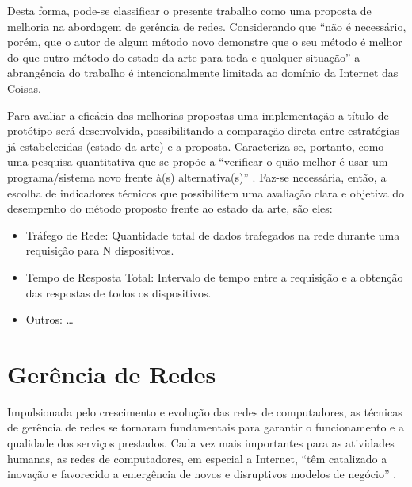 \documentclass[twoside,english,brazilian]{UNISINOSmonografia}
\begin{document}
Desta forma, pode-se classificar o presente trabalho como uma proposta de 
melhoria na abordagem de gerência de redes. Considerando que ``não é 
necessário, porém, que o autor de algum método novo demonstre que o seu método 
é melhor do que outro método do estado da arte para toda e qualquer situação'' 
\cite{Wazlawick2008} a abrangência do trabalho é intencionalmente limitada ao 
domínio da Internet das Coisas. %

Para avaliar a eficácia das melhorias propostas uma implementação a título de  
protótipo será desenvolvida, possibilitando a comparação direta entre 
estratégias já estabelecidas (estado da arte) e a proposta. Caracteriza-se, 
portanto, como uma pesquisa quantitativa que se propõe a ``verificar o
quão melhor é usar um programa/sistema novo frente à(s) alternativa(s)'' 
\cite{Jacques2007}.
Faz-se necessária, então, a escolha de indicadores técnicos que
possibilitem uma avaliação clara e objetiva do desempenho do 
método proposto frente ao estado da arte, são eles:


\begin{itemize}

	\item Tráfego de Rede: 
Quantidade total de dados trafegados na rede durante uma requisição para N dispositivos.

	\item Tempo de Resposta Total: 
Intervalo de tempo entre a requisição e a obtenção das respostas de todos os dispositivos.

	\item Outros: \dots
\end{itemize}


\chapter{Gerência de Redes}

	Impulsionada pelo crescimento e evolução das redes de computadores, as 
	técnicas de gerência de redes se tornaram fundamentais para garantir o 
	funcionamento e a qualidade dos serviços prestados. Cada vez mais 
	importantes para as atividades humanas, as redes de computadores, em 
	especial a Internet, ``têm catalizado a inovação e favorecido a emergência 
	de novos e disruptivos modelos de negócio'' \cite{Ding2009}.
	
\end{document}
